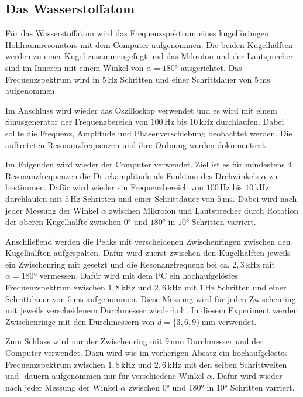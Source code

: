 \subsection{Das Wasserstoffatom}
\label{sec:d_H}

Für das Wasserstoffatom wird das Frequenzspektrum eines kugelförimgen Hohlraumresonators mit dem Computer aufgenommen. Die beiden Kugelhälften werden zu einer Kugel zusammengefügt und das Mikrofon und der Lautsprecher sind im Inneren mit einem Winkel von $\alpha = 180°$ ausgerichtet. Das Frequenzspektrum wird in $5 \, \mathrm{Hz}$ Schritten und einer Schrittdauer von $5 \, \mathrm{ms}$ aufgenommen. \newline

Im Anschluss wird wieder das Oszilloskop verwendet und es wird mit einem Sinusgenerator der Frequenzbereich von $100 \, \mathrm{Hz}$ bis $10 \, \mathrm{kHz}$ durchlaufen. Dabei sollte die Frequenz, Amplitude und Phasenverschiebung beobachtet werden. Die auftreteten Resonanzfrequenzen und ihre Ordnung werden dokumentiert. \newline

Im Folgenden wird wieder der Computer verwendet. Ziel ist es für mindestens 4 Resonanzfrequenzen die Druckamplitude als Funktion des Drehwinkels $\alpha$ zu bestimmen. Dafür wird wieder ein Frequenzbereich von $100 \, \mathrm{Hz}$ bis $10 \, \mathrm{kHz}$ durchlaufen mit $5 \, \mathrm{Hz}$ Schritten und einer Schrittdauer von $5 \, \mathrm{ms}$. Dabei wird nach jeder Messung der Winkel $\alpha$ zwischen Mikrofon und Lautsprecher durch Rotation der oberen Kugelhälfte zwischen $0°$ und $180°$ in $10°$ Schritten varriert. \newline

Anschließend werden die Peaks mit verscheidenen Zwischenringen zwischen den Kugelhälften aufgespalten. Dafür wird zuerst zwischen den Kugelhälften jeweils ein Zwischenring mit gesetzt und die Resonanzfrequenz bei ca. $2, \! 3 \, \mathrm{kHz}$ mit $\alpha = 180°$ vermessen. Dafür wird mit dem PC ein hochaufgelöstes Frequenzspektrum zwischen $1, \! 8 \, \mathrm{kHz}$ und $2, \! 6 \, \mathrm{kHz}$ mit $1 \, \mathrm{Hz}$ Schritten und einer Schrittdauer von $5 \, \mathrm{ms}$ aufgenommen. Diese Messung wird für jeden Zwischenring mit jeweils verscheidenem Durchmesser wiederholt. In diesem Experiment werden Zwischenringe mit den Durchmessern von $d = \{ 3, 6, 9 \} \, \mathrm{mm}$ verwendet. \newline

Zum Schluss wird nur der Zwischenring mit $9 \, \mathrm{mm}$ Durchmesser und der Computer verwendet. Dazu wird wie im vorherigen Absatz ein hochaufgelöstes Frequenzspektrum zwischen $1, \! 8 \, \mathrm{kHz}$ und $2, \! 6 \, \mathrm{kHz}$ mit den selben Schrittweiten und -dauern aufgenommen nur für verschiedene Winkel $\alpha$. Dafür wird wieder nach jeder Messung der Winkel $\alpha$ zwischen $0°$ und $180°$ in $10°$ Schritten varriert.

